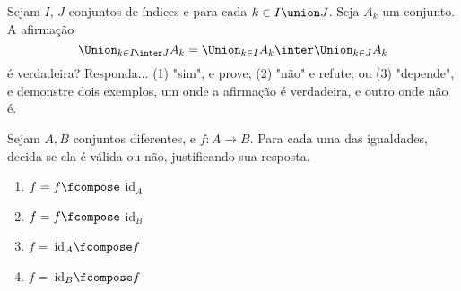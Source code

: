 \begin{exercise}
    Sejam $I$, $J$ conjuntos de índices e para cada $k \in I \union J$. Seja $A_k$ um conjunto. A afirmação
    $$
        \Union_{k \in I \inter J} A_k = \Union_{k \in I} A_k \inter \Union_{k \in J}A_{k}
    $$
    é verdadeira? Responda... (1) "sim", e prove; (2) "não" e refute; ou (3) "depende", e demonstre dois exemplos, um onde a afirmação é verdadeira, e outro onde não é.
\end{exercise}

\begin{exercise}
    Sejam $A,B$ conjuntos diferentes, e $f : A \to B$. Para cada uma das igualdades, decida se ela é válida ou não, justificando sua resposta.
    \begin{enumerate}[(1)]
        \item $f = f \fcompose$ id$_A$
        \item $f = f \fcompose$ id$_B$
        \item $f =\ $id$_A \fcompose f$
        \item $f =\ $id$_B \fcompose f$
    \end{enumerate}
\end{exercise}

